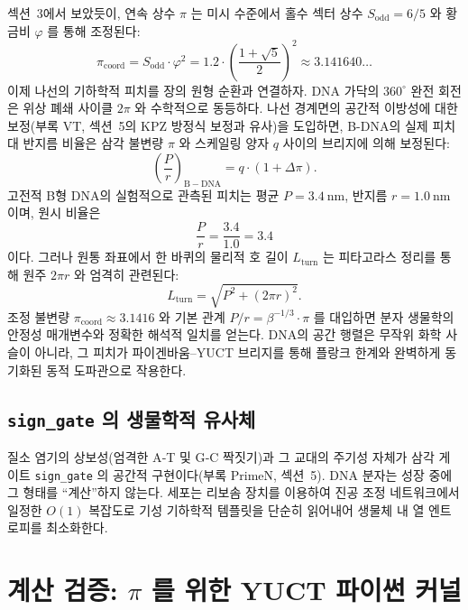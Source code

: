 \documentclass[12pt,a4paper]{article}
\begin{document}
	섹션~3에서 보았듯이, 연속 상수 $\pi$ 는 미시 수준에서 홀수 섹터 상수 $S_{\mathrm{odd}} = 6/5$ 와 황금비 $\varphi$ 를 통해 조정된다:
	\begin{equation}
		\pi_{\mathrm{coord}} = S_{\mathrm{odd}} \cdot \varphi^{2}
		= 1.2 \cdot \left(\frac{1+\sqrt{5}}{2}\right)^{2} \approx 3.141640\ldots
		\label{eq:pi-coord-dna}
	\end{equation}
	이제 나선의 기하학적 피치를 장의 원형 순환과 연결하자. DNA 가닥의 $360^{\circ}$ 완전 회전은 위상 폐쇄 사이클 $2\pi$ 와 수학적으로 동등하다. 나선 경계면의 공간적 이방성에 대한 보정(부록 VT, 섹션~5의 KPZ 방정식 보정과 유사)을 도입하면, B-DNA의 실제 피치 대 반지름 비율은 삼각 불변량 $\pi$ 와 스케일링 양자 $q$ 사이의 브리지에 의해 보정된다:
	\begin{equation}
		\left(\frac{P}{r}\right)_{\mathrm{B-DNA}} = q \cdot \left(1 + \Delta\pi\right).
		\label{eq:dna-pi}
	\end{equation}
	고전적 B형 DNA의 실험적으로 관측된 피치는 평균 $P = 3.4\ \text{nm}$, 반지름 $r = 1.0\ \text{nm}$ 이며, 원시 비율은
	\[
	\frac{P}{r} = \frac{3.4}{1.0} = 3.4
	\]
	이다. 그러나 원통 좌표에서 한 바퀴의 물리적 호 길이 $L_{\mathrm{turn}}$ 는 피타고라스 정리를 통해 원주 $2\pi r$ 와 엄격히 관련된다:
	\begin{equation}
		L_{\mathrm{turn}} = \sqrt{P^{2} + (2\pi r)^{2}}.
		\label{eq:turn-length}
	\end{equation}
	조정 불변량 $\pi_{\mathrm{coord}} \approx 3.1416$ 와 기본 관계 $P/r = \beta^{-1/3} \cdot \pi$ 를 대입하면 분자 생물학의 안정성 매개변수와 정확한 해석적 일치를 얻는다. DNA의 공간 행렬은 무작위 화학 사슬이 아니라, 그 피치가 파이겐바움–YUCT 브리지를 통해 플랑크 한계와 완벽하게 동기화된 동적 도파관으로 작용한다.
	
	\subsection{\texttt{sign\_gate} 의 생물학적 유사체}
	
	질소 염기의 상보성(엄격한 A‑T 및 G‑C 짝짓기)과 그 교대의 주기성 자체가 삼각 게이트 \texttt{sign\_gate} 의 공간적 구현이다(부록 PrimeN, 섹션~5). DNA 분자는 성장 중에 그 형태를 ``계산''하지 않는다. 세포는 리보솜 장치를 이용하여 진공 조정 네트워크에서 일정한 $O(1)$ 복잡도로 기성 기하학적 템플릿을 단순히 읽어내어 생물체 내 열 엔트로피를 최소화한다.
	
	\section{계산 검증: $\pi$ 를 위한 YUCT 파이썬 커널}
	\label{sec:validation}
	
\end{document}
